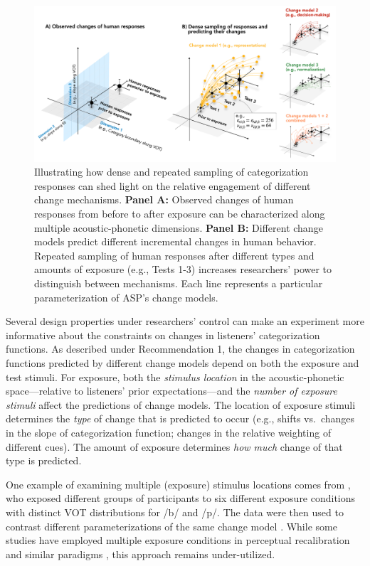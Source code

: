 \documentclass[
  11pt,
  man,floatsintext]{apa6}
\begin{document}
\begin{figure}[h]
\begin{center}
\includegraphics[width=1 \columnwidth]{../figures/diagrams/repeated-sampling.png}
\caption{Illustrating how dense and repeated sampling of categorization responses can shed light on the relative engagement of different change mechanisms. {\bf Panel A:} Observed changes of human responses from before to after exposure can be characterized along multiple acoustic-phonetic dimensions. {\bf Panel B:} Different change models predict different incremental changes in human behavior. Repeated sampling of human responses after different types and amounts of exposure (e.g., Tests 1-3) increases researchers' power to distinguish between mechanisms. Each line represents a particular parameterization of ASP's change models.}\label{fig:repeated-sampling}
\end{center}
\end{figure}

Several design properties under researchers' control can make an experiment more informative about the constraints on changes in listeners' categorization functions. As described under Recommendation 1, the changes in categorization functions predicted by different change models depend on both the exposure and test stimuli. For exposure, both the \emph{stimulus location} in the acoustic-phonetic space---relative to listeners' prior expectations---and the \emph{number of exposure stimuli} affect the predictions of change models. The location of exposure stimuli determines the \emph{type} of change that is predicted to occur (e.g., shifts vs.~changes in the slope of categorization function; changes in the relative weighting of different cues). The amount of exposure determines \emph{how much} change of that type is predicted.

One example of examining multiple (exposure) stimulus locations comes from \textcite{kleinschmidt-jaeger2016cogsci}, who exposed different groups of participants to six different exposure conditions with distinct VOT distributions for /b/ and /p/. The data were then used to contrast different parameterizations of the same change model \autocite[for additional analyses and insightful discussion, see also][]{kleinschmidt2020}. While some studies have employed multiple exposure conditions in perceptual recalibration and similar paradigms \autocites[e.g.,][]{babel2019,sumner2011}, this approach remains under-utilized.
\end{document}

